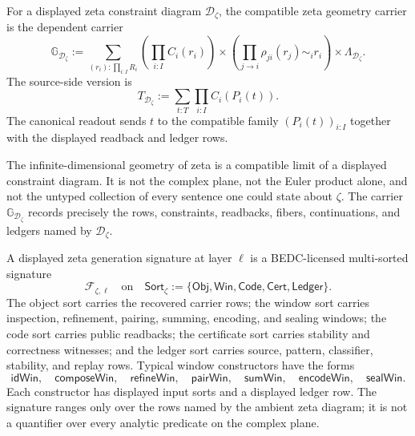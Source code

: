 \begin{definition}
\label{def:rh-compatible-zeta-geometry-carrier}
For a displayed zeta constraint diagram $\mathcal D_{\zeta}$, the
compatible zeta geometry carrier is the dependent carrier
$$
\mathbb G_{\mathcal D_{\zeta}}
:=
\sum_{(r_i):\prod_{i:I}R_i}
\left(
\prod_{i:I}C_i(r_i)
\right)
\times
\left(
\prod_{j\to i}\rho_{ji}(r_j)\sim_i r_i
\right)
\times
\Lambda_{\mathcal D_{\zeta}}.
$$
The source-side version is
$$
T_{\mathcal D_{\zeta}}
:=
\sum_{t:T}
\prod_{i:I}C_i(P_i(t)).
$$
The canonical readout sends $t$ to the compatible family
$(P_i(t))_{i:I}$ together with the displayed readback and ledger rows.
\end{definition}

\begin{principle}
\label{prin:rh-zeta-constraint-totality-relative}
The infinite-dimensional geometry of zeta is a compatible limit of a
displayed constraint diagram. It is not the complex plane, not the Euler
product alone, and not the untyped collection of every sentence one could
state about $\zeta$. The carrier $\mathbb G_{\mathcal D_{\zeta}}$
records precisely the rows, constraints, readbacks, fibers, continuations,
and ledgers named by $\mathcal D_{\zeta}$.
\end{principle}

\begin{definition}
\label{def:rh-displayed-zeta-generation-signature}
A displayed zeta generation signature at layer $\ell$ is a BEDC-licensed
multi-sorted signature
$$
\mathcal F_{\zeta,\ell}
\quad\text{on}\quad
\mathsf{Sort}_{\zeta}
:=
\{
\mathsf{Obj},
\mathsf{Win},
\mathsf{Code},
\mathsf{Cert},
\mathsf{Ledger}
\}.
$$
The object sort carries the recovered carrier rows; the window sort carries
inspection, refinement, pairing, summing, encoding, and sealing windows; the
code sort carries public readbacks; the certificate sort carries stability
and correctness witnesses; and the ledger sort carries source, pattern,
classifier, stability, and replay rows. Typical window constructors have the
forms
$$
\mathsf{idWin},\quad
\mathsf{composeWin},\quad
\mathsf{refineWin},\quad
\mathsf{pairWin},\quad
\mathsf{sumWin},\quad
\mathsf{encodeWin},\quad
\mathsf{sealWin}.
$$
Each constructor has displayed input sorts and a displayed ledger row. The
signature ranges only over the rows named by the ambient zeta diagram; it is
not a quantifier over every analytic predicate on the complex plane.
\end{definition}

